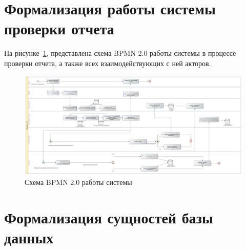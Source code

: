 \section{Формализация работы системы проверки отчета}
На рисунке~\ref{img:main_sys_bpmn}, представлена схема BPMN 2.0 работы системы в процессе проверки отчета, а также всех взаимодействующих с ней акторов.
\pagebreak
 \begin{figure}
	\includegraphics[width=\textheight]{./inc/img/process_check_bpmn.pdf}
	  \caption{Схема BPMN 2.0 работы системы}
	\label{img:main_sys_bpmn}
\end{figure}


\section{Формализация сущностей базы данных}


